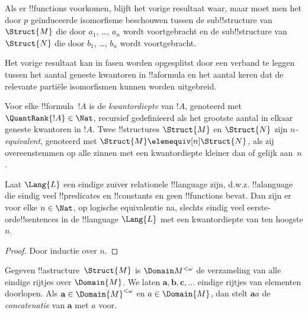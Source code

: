\documentclass[../../../include/open-logic-section]{subfiles}
\begin{document}
\begin{rem}
Als er !!{function}s voorkomen, blijft het vorige resultaat waar, maar
moet men het door $p$ geïnduceerde isomorfisme beschouwen tussen de
sub!!{structure} van $\Struct{M}$ die door $a_1$, \dots, $a_n$ wordt
voortgebracht en de sub!!{structure} van $\Struct{N}$ die door
$b_1$, \dots, $b_n$ wordt voortgebracht.
\end{rem}

Het vorige resultaat kan in fasen worden opgesplitst door een verband te
leggen tussen het aantal geneste kwantoren in !!a{formula} en het aantal
keren dat de relevante partiële isomorfismen kunnen worden uitgebreid.

\begin{defn}
  Voor elke !!{formula}~$!A$ is de \emph{kwantordiepte} van $!A$,
  genoteerd met $\QuantRank{!A} \in \Nat$, recursief gedefinieerd als
  het grootste aantal in elkaar geneste kwantoren in $!A$. Twee
  !!{structure}s $\Struct{M}$ en $\Struct{N}$ zijn
  \emph{$n$-equivalent}, genoteerd met
  $\Struct{M} \elemequiv[n] \Struct{N}$, als zij overeenstemmen op alle
  zinnen met een kwantordiepte kleiner dan of gelijk aan~$n$.
\end{defn}

\begin{prop}
  Laat $\Lang{L}$ een eindige zuiver relationele !!{language} zijn,
  d.w.z. !!a{language} die eindig veel !!{predicate}s en
  !!{constant}s en geen !!{function}s bevat. Dan zijn er voor elke
  $n \in \Nat$, op logische equivalentie na, slechts eindig veel
  eerste-orde!!{sentence}s in de !!{language} $\Lang{L}$ met een
  kwantordiepte van ten hoogste $n$.
\end{prop}

\begin{proof}
  Door inductie over $n$.
\end{proof}

\begin{defn}
  Gegeven !!a{structure}~$\Struct{M}$ is $\Domain M^{<\omega}$ de
  verzameling van alle eindige rijtjes over $\Domain{M}$. We laten
  $\mathbf{a}, \mathbf{b}, \mathbf{c}, \ldots$ eindige rijtjes van
  elementen doorlopen. Als $\mathbf{a} \in \Domain{M}^{<\omega}$ en
  $a \in \Domain{M}$, dan stelt $\mathbf{a}a$ de
  \emph{concatenatie} van $\mathbf{a}$ met $a$ voor.
\end{defn}
\end{document}
